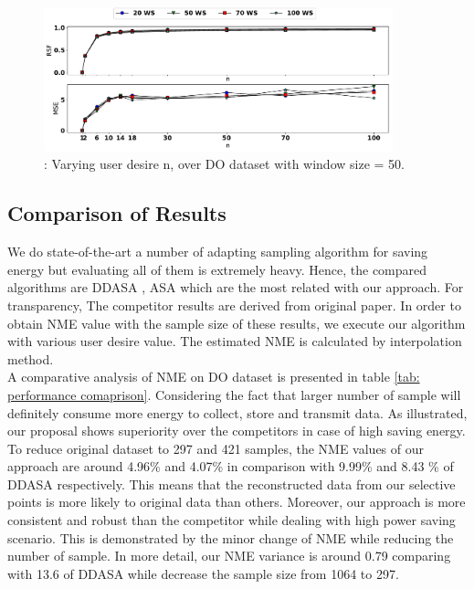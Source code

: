 \begin{figure}[h]
	\centering
	\includegraphics[width=0.9\textwidth]{Part3/Chapter8/figures/result_various_windowsize_iot.pdf}
	\caption{ : Varying user desire n, over DO dataset with window size = 50.}
	\label{fig: various_ws_iot}
\end{figure}

\subsection{Comparison of Results}
We do state-of-the-art a number of adapting sampling algorithm for saving energy but evaluating all of them is extremely heavy. Hence, the compared algorithms are DDASA \cite{shu2017energy}, ASA \cite{alippi2010adaptive} which are the most related with our approach. For transparency, The competitor results are derived from original paper. In order to obtain NME value with the sample size of these results, we execute our algorithm with various user desire value. The estimated NME is calculated by interpolation method.\\

A comparative analysis of NME on DO dataset is presented in table \ref{tab: performance comaprison}. Considering the fact that larger number of sample will definitely consume more energy to collect, store and transmit data. As illustrated, our proposal shows superiority  over the competitors in case of high saving energy. To reduce original dataset to 297 and 421 samples,  the NME values of our approach are around 4.96\% and 4.07\% in comparison with 9.99\% and 8.43 \% of DDASA respectively. This means that the reconstructed data from our selective points is more likely to original data than others. Moreover, our approach is more consistent and robust than the competitor while dealing with high power saving scenario. This is demonstrated by the minor change of NME while reducing the number of sample. In more detail, our NME variance is around 0.79 comparing with 13.6 of DDASA while decrease the sample size from 1064 to 297.\\


